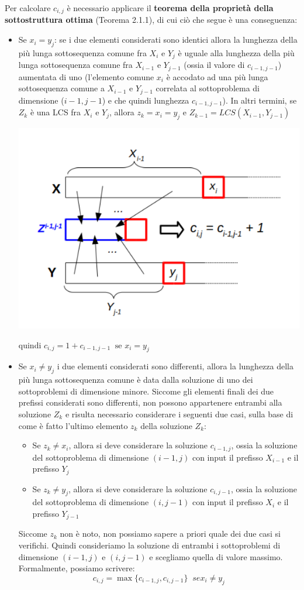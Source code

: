 \documentclass[12pt]{article}
\begin{document}
Per calcolare $c_{i,j}$ è necessario applicare il \textbf{teorema della proprietà della sottostruttura ottima} (Teorema 2.1.1), di cui ciò che segue è una conseguenza:
\begin{itemize}
    \item Se $x_i = y_j$: se i due elementi considerati sono identici allora la lunghezza della più lunga sottosequenza comune fra $X_i$ e $Y_j$ è uguale alla lunghezza della più lunga sottosequenza comune fra $X_{i-1}$ e $Y_{j-1}$ (ossia il valore di $c_{i-1,j-1}$)
    aumentata di uno (l'elemento comune $x_i$ è accodato ad una più lunga sottosequenza comune a $X_{i-1}$ e $Y_{j-1}$ correlata al sottoproblema di dimensione ($i-1, j-1$) e che quindi lunghezza $c_{i-1,j-1}$).
    In altri termini, se $Z_k$ è una LCS fra $X_i$ e $Y_j$, allora $z_k = x_i = y_j$ e $Z_{k-1} = LCS(X_{i-1}, Y_{j-1})$
    \begin{center}
        \includegraphics[width = 0.50\linewidth]{Images/5.png}
    \end{center}
    quindi $c_{i,j} = 1 + c_{i-1, j-1} \; \; \textrm{se } x_i = y_j$
    \item Se $x_i \neq y_j$ i due elementi considerati sono differenti, allora la lunghezza della più lunga sottosequenza comune è data dalla soluzione di uno dei sottoproblemi di dimensione minore.
    Siccome gli elementi finali dei due prefissi considerati sono differenti, non possono appartenere entrambi alla soluzione $Z_k$ e risulta necessario considerare i seguenti due casi, sulla base di come è fatto l'ultimo elemento $z_k$ della soluzione $Z_k$:
    \begin{itemize}
        \item Se $z_k \neq x_i$, allora si deve considerare la soluzione $c_{i-1,j}$, ossia la soluzione del sottoproblema di dimensione $(i-1,j)$ con input il prefisso $X_{i-1}$ e il prefisso $Y_j$
        \item Se $z_k \neq y_j$, allora si deve considerare la soluzione $c_{i,j-1}$, ossia la soluzione del sottoproblema di dimensione $(i,j-1)$ con input il prefisso $X_i$ e il prefisso $Y_{j-1}$
    \end{itemize}
    Siccome $z_k$ non è noto, non possiamo sapere a priori quale dei due casi si verifichi. Quindi consideriamo la soluzione di entrambi i sottoproblemi di dimensione $(i-1,j)$ e $(i, j-1)$ e scegliamo quella di valore massimo.
    Formalmente, possiamo scrivere:
    $$c_{i,j} = \max\{c_{i-1,j}, c_{i,j-1}\} \; \; se x_i \neq y_j$$
\end{itemize}
\end{document}
